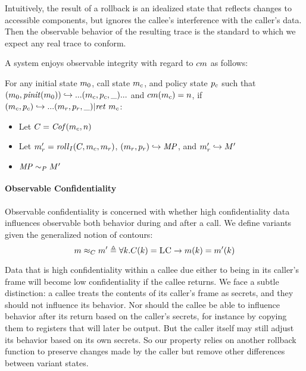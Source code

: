 \documentclass[acmsmall,review,anonymous]{acmart}\settopmatter{printfolios=true,printccs=false,printacmref=false}
\begin{document}
      Intuitively, the result of a rollback is an idealized state that reflects changes to accessible
      components, but ignores the callee's interference with the caller's data. Then the observable
      behavior of the resulting trace is the standard to which we expect any real trace to conform.

      A system enjoys observable integrity with regard to \(cm\) as follows:

      For any initial state \(m_0\), call state \(m_c\), and policy state \(p_c\) such that
      \((m_0,\mathit{pinit}(m_0)) \hookrightarrow ... (m_c,p_c,\_) ...\)
      and \(cm(m_c) = n\), if \((m_c,p_c) \hookrightarrow ...
        (m_r,p_r,\_) | \mathit{ret}\ m_c\):

          \begin{itemize}
            \item Let \(C = \mathit{Cof}(m_c,n)\)
            \item Let \(m_r' = \mathit{roll}_I(C,m_c,m_r)\), \((m_r,p_r)
              \hookrightarrow \mathit{MP}\), and \(m_r' \hookrightarrow M'\)
            \item \(\mathit{MP} \sim_P M'\)
          \end{itemize}
    

      
    \paragraph{Observable Confidentiality}

      Observable confidentiality is concerned with whether high confidentiality data influences
      observable both behavior during and after a call. We define variants given the generalized notion
      of contours:
      \[m \approx_C m' \triangleq \forall k .
      C(k) = \textsc{LC} \rightarrow m(k) = m'(k)\]

      Data that is high confidentiality within a callee due either to being in its caller's frame
      will become low confidentiality if the callee returns. We face a subtle distinction: 
      a callee treats the contents of its caller's frame as secrets, and they should not influence
      its behavior. Nor should the callee be able to influence behavior after its return based
      on the caller's secrets, for instance by copying them to registers that will later be output.
      But the caller itself may still adjust its behavior based on its own secrets. So our property
      relies on another rollback function to preserve changes made by the caller but remove other
      differences between variant states.
\end{document}
